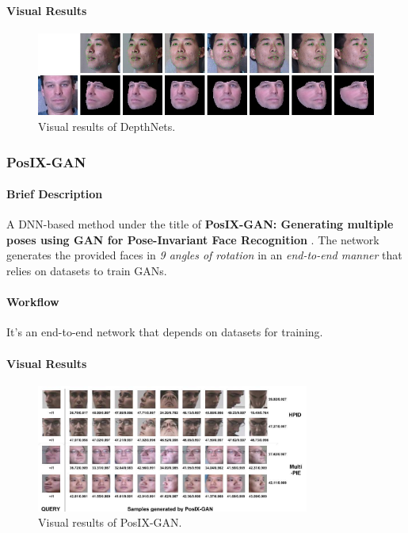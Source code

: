 \paragraph{Visual Results}
\begin{figure}[H]
    \centering
    \includegraphics[width=\textwidth]{images/depthnets.png}
    \caption{Visual results of DepthNets.}
    \label{fig:dn}
\end{figure}

\subsubsection{PosIX-GAN}

\paragraph{Brief Description}
A DNN-based method under the title of \textbf{PosIX-GAN: Generating multiple poses using GAN for Pose-Invariant Face Recognition} \cite{inbook}. The network generates the provided faces in \emph{9 angles of rotation} in an \emph{end-to-end manner} that relies on datasets to train GANs.

\paragraph{Workflow}
It's an end-to-end network that depends on datasets for training.

\paragraph{Visual Results}
\begin{figure}[H]
    \centering
    \includegraphics[width=0.8\textwidth]{images/posix-gan.png}
    \caption{Visual results of PosIX-GAN.}
    \label{fig:posix}
\end{figure}

